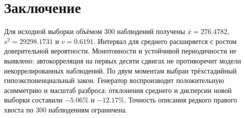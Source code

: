 \documentclass[11pt,a4paper]{article}
\begin{document}
\section{Заключение}
Для исходной выборки объёмом 300 наблюдений получены $\bar x=276.4782$, $s^2=29298.1731$ и $v=0.6191$. Интервал для среднего расширяется с ростом доверительной вероятности. Монотонности и устойчивой периодичности не выявлено; автокорреляция на первых десяти сдвигах не противоречит модели некоррелированных наблюдений. По двум моментам выбран трёхстадийный гипоэкспоненциальный закон. Генератор воспроизводит положительную асимметрию и масштаб разброса: отклонения среднего и дисперсии новой выборки составили $-5.06\%$ и $-12.17\%$. Точность описания редкого правого хвоста по 300 наблюдениям ограничена.
\end{document}
